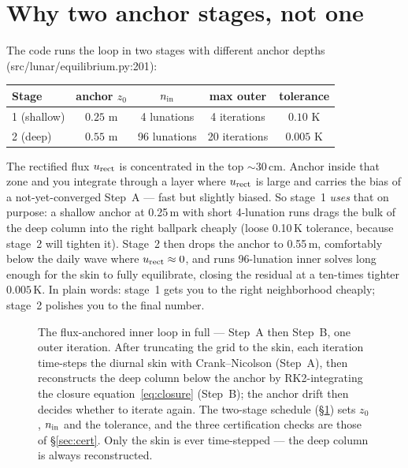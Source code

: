 \documentclass[11pt]{report}
\newcommand{\code}[1]{{\ttfamily\small #1}}
\begin{document}
\section{Why two anchor stages, not one}\label{sec:twostage}

The code runs the loop in two stages with different anchor depths
(\code{src/lunar/equilibrium.py:201}):
\begin{center}\small
\begin{tabular}{@{}lcccc@{}}
\toprule
Stage & anchor $z_0$ & $n_{\rm in}$ & max outer & tolerance \\
\midrule
1 (shallow) & $0.25$ m & 4 lunations  & 4 iterations  & $0.10$ K \\
2 (deep)    & $0.55$ m & 96 lunations & 20 iterations & $0.005$ K \\
\bottomrule
\end{tabular}
\end{center}

\noindent The rectified flux $u_{\rm rect}$ is concentrated in the top
$\sim$30\,cm. Anchor inside that zone and you integrate through a layer where
$u_{\rm rect}$ is large and carries the bias of a not-yet-converged Step~A ---
fast but slightly biased. So stage~1 \emph{uses} that on purpose: a shallow
anchor at 0.25\,m with short 4-lunation runs drags the bulk of the deep column
into the right ballpark cheaply (loose 0.10\,K tolerance, because stage~2 will
tighten it). Stage~2 then drops the anchor to 0.55\,m, comfortably below the
daily wave where $u_{\rm rect}\approx0$, and runs 96-lunation inner solves long
enough for the skin to fully equilibrate, closing the residual at a ten-times
tighter $0.005$\,K. In plain words: stage~1 gets you to the right neighborhood
cheaply; stage~2 polishes you to the final number.

\begin{figure}[p]\centering
\resizebox{!}{0.80\textheight}{}
\caption{The flux-anchored inner loop in full --- Step~A then Step~B, one outer
iteration. After truncating the grid to the skin, each iteration time-steps the
diurnal skin with Crank--Nicolson (Step~A), then reconstructs the deep column
below the anchor by RK2-integrating the closure equation~\eqref{eq:closure}
(Step~B); the anchor drift then decides whether to iterate again. The two-stage
schedule (\S\ref{sec:twostage}) sets $z_0$, $n_{\rm in}$ and the tolerance, and the
three certification checks are those of \S\ref{sec:cert}. Only the skin is ever
time-stepped --- the deep column is always reconstructed.}
\label{fig:stepsABflow}
\end{figure}
\end{document}
